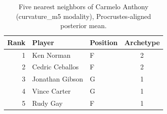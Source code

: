 \begin{table}[htbp]
  \centering\small
  \begin{tabular}{rllc}
    \toprule
    Rank & Player & Position & Archetype \\
    \midrule
    1 & Ken Norman & F & 2 \\
    2 & Cedric Ceballos & F & 2 \\
    3 & Jonathan Gibson & G & 1 \\
    4 & Vince Carter & G & 1 \\
    5 & Rudy Gay & F & 1 \\
    \bottomrule
  \end{tabular}
  \caption{Five nearest neighbors of Carmelo Anthony (curvature_m5 modality), Procrustes-aligned posterior mean.}
  \label{tab:Carmelo_Anthony_neighbors_curvature_m5}
\end{table}

